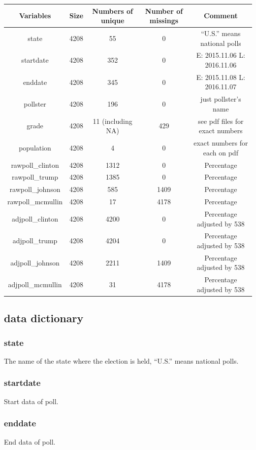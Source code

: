 \documentclass[12pt]{article}
\begin{document}
	\begin{tabular}{|c|c|c|c|c|}
		\hline
		Variables & Size & Numbers of unique & Number of missings & Comment\\
		\hline
		state & 4208 & 55 & 0 &  “U.S.” means national polls \\
		\hline
		startdate & 4208 & 352 & 0 & E: 2015.11.06  L: 2016.11.06 \\
		\hline
		enddate & 4208 & 345 & 0 & E: 2015.11.08  L: 2016.11.07 \\
		\hline
		pollster & 4208 & 196 & 0 & just pollster's name \\
		\hline
		grade & 4208 & 11 (including NA) & 429 & see pdf files for exact numbers\\
		\hline
		population & 4208 & 4 & 0 & exact numbers for each on pdf \\
		\hline
		rawpoll\_clinton & 4208 & 1312 & 0 & Percentage \\
		\hline
		rawpoll\_trump & 4208 & 1385 & 0 & Percentage \\
		\hline
		rawpoll\_johnson & 4208 & 585 & 1409 & Percentage \\
		\hline
		rawpoll\_mcmullin & 4208 & 17 & 4178 & Percentage \\
		\hline
		adjpoll\_clinton & 4208 & 4200 & 0 & Percentage adjusted by 538 \\
		\hline
		adjpoll\_trump & 4208 & 4204 & 0 & Percentage adjusted by 538 \\
		\hline
		adjpoll\_johnson & 4208 & 2211 & 1409 & Percentage adjusted by 538 \\
		\hline
		adjpoll\_mcmullin & 4208 & 31 & 4178 & Percentage adjusted by 538 \\
		\hline
	\end{tabular}
	        
	\subsection{data dictionary}
	\subsubsection{state}
	The name of the state where the election is held, “U.S.” means national polls.
	\subsubsection{startdate}
	Start data of poll.
	\subsubsection{enddate}
	End data of poll.
\end{document}
